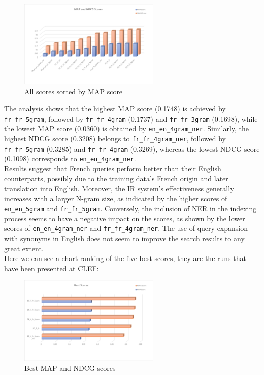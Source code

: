 \begin{figure}[h!]
	\centering
	\includegraphics[width=0.6\textwidth]{figure/allScores.png}
	\caption{All scores sorted by MAP score}
	\label{fig:sorted_scores}
\end{figure}
The analysis shows that the highest MAP score (0.1748) is achieved by \texttt{fr\_fr\_5gram}, followed by \texttt{fr\_fr\_4gram} (0.1737) and \texttt{fr\_fr\_3gram} (0.1698), while the lowest MAP score (0.0360) is obtained by \texttt{en\_en\_4gram\_ner}.
Similarly, the highest NDCG score (0.3208) belongs to \texttt{fr\_fr\_4gram\_ner}, followed by \texttt{fr\_fr\_5gram} (0.3285) and \texttt{fr\_fr\_4gram} (0.3269), whereas the lowest NDCG score (0.1098) corresponds to \texttt{en\_en\_4gram\_ner}.\\
Results suggest that French queries perform better than their English counterparts, possibly due to the training data's French origin and later translation into English. Moreover, the IR system's effectiveness generally increases with a larger N-gram size, as indicated by the higher scores
of \texttt{en\_en\_5gram} and \texttt{fr\_fr\_5gram}. Conversely, the inclusion of NER in the indexing process seems to have a negative impact on the scores, as shown by the lower scores of \texttt{en\_en\_4gram\_ner} and \texttt{fr\_fr\_4gram\_ner}.
The use of query expansion with synonyms in English does not seem to improve the search results to any great extent.\\
Here we can see a chart ranking of the five best scores, they are the runs that have been presented at CLEF:
\begin{figure}[h!]
	\centering
	\includegraphics[width=0.6\textwidth]{figure/bestScores.png}
	\caption{Best MAP and NDCG scores}
	\label{fig:best_scores}
\end{figure}
